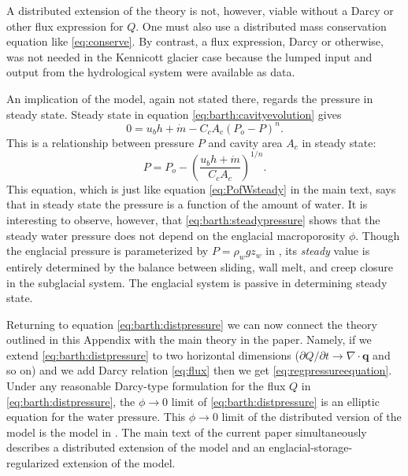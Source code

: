 \documentclass[11pt,final]{amsart}
\newcommand\bq{\mathbf{q}}
\newcommand{\Div}{\nabla\cdot}
\begin{document}
A distributed extension of the \cite{Bartholomausetal2011} theory is not, however, viable without a Darcy or other flux expression for $Q$.  One must also use a distributed mass conservation equation like \eqref{eq:conserve}.  By contrast, a flux expression, Darcy or otherwise, was not needed in the Kennicott glacier case because the lumped input and output from the hydrological system were available as data.

An implication of the \cite{Bartholomausetal2011} model, again not stated there, regards the pressure in steady state.  Steady state in equation \eqref{eq:barth:cavityevolution} gives
\begin{equation*}
0 = u_b h + \dot m - C_c A_c (P_o-P)^n.
\end{equation*}
This is a relationship between pressure $P$ and cavity area $A_c$ in steady state:
\begin{equation}
P = P_o - \left(\frac{u_b h + \dot m}{C_c A_c}\right)^{1/n}. \label{eq:barth:steadypressure}
\end{equation}
This equation, which is just like equation \eqref{eq:PofWsteady} in the main text, says that in steady state the pressure is a function of the amount of water.  It is interesting to observe, however, that \eqref{eq:barth:steadypressure} shows that the steady water pressure does not depend on the englacial macroporosity $\phi$.  Though the englacial pressure is parameterized by $P=\rho_w g z_w$ in \cite{Bartholomausetal2011}, its \emph{steady} value is entirely determined by the balance between sliding, wall melt, and creep closure in the subglacial system.  The englacial system is passive in determining steady state.

Returning to equation \eqref{eq:barth:distpressure} we can now connect the theory outlined in this Appendix with the main theory in the paper.  Namely, if we extend \eqref{eq:barth:distpressure} to two horizontal dimensions ($\partial Q/\partial t \to \Div \bq$ and so on) and we add Darcy relation \eqref{eq:flux} then we get \eqref{eq:regpressureequation}.  Under any reasonable Darcy-type formulation for the flux $Q$ in \eqref{eq:barth:distpressure}, the $\phi\to 0$ limit of \eqref{eq:barth:distpressure} is an elliptic equation for the water pressure.  This $\phi\to 0$ limit of the distributed version of the \cite{Bartholomausetal2011} model is the model in \cite{Schoofetal2012}.  The main text of the current paper simultaneously describes a distributed extension of the \cite{Bartholomausetal2011} model and an englacial-storage-regularized extension of the \cite{Schoofetal2012} model.
\end{document}
